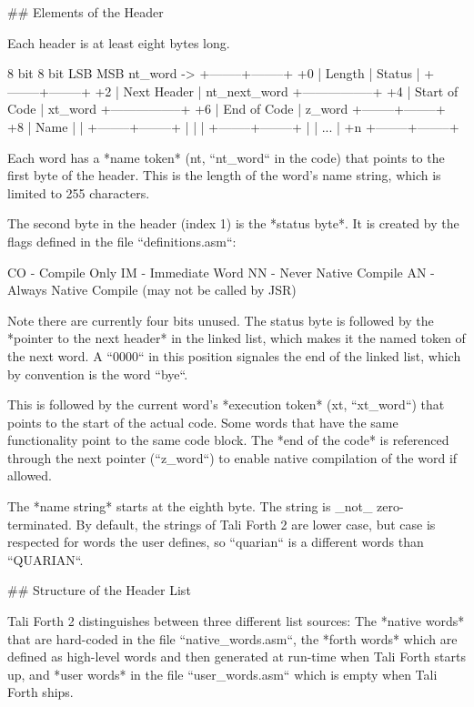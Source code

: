 ## Elements of the Header

Each header is at least eight bytes long.

              8 bit     8 bit
               LSB       MSB
 nt_word ->  +--------+--------+
          +0 | Length | Status |
             +--------+--------+
          +2 | Next Header     | nt_next_word
             +-----------------+
          +4 | Start of Code   | xt_word 
             +-----------------+
          +6 | End of Code     | z_word
             +--------+--------+
          +8 | Name   |        |
             +--------+--------+
             |        |        |
             +--------+--------+
             |        |  ...   |
          +n +--------+--------+


Each word has a *name token* (nt, ``nt_word`` in the code) that points to the
first byte of the header. This is the length of the word's name string, which is
limited to 255 characters. 

The second byte in the header (index 1) is the *status byte*. It is created by
the flags defined in the file ``definitions.asm``: 

        CO - Compile Only
        IM - Immediate Word
        NN - Never Native Compile 
        AN - Always Native Compile (may not be called by JSR)

Note there are currently four bits unused. The status byte is followed by the
*pointer to the next header* in the linked list, which makes it the named token of
the next word. A ``0000`` in this position signales the end of the linked list,
which by convention is the word ``bye``. 

This is followed by the current word's *execution token* (xt, ``xt_word``) that
points to the start of the actual code. Some words that have the same
functionality point to the same code block. The *end of the code* is referenced
through the next pointer (``z_word``) to enable native compilation of the word
if allowed. 

The *name string* starts at the eighth byte. The string is _not_
zero-terminated. By default, the strings of Tali Forth 2 are lower case, but
case is respected for words the user defines, so ``quarian`` is a different
words than ``QUARIAN``. 


## Structure of the Header List 

Tali Forth 2 distinguishes between three different list sources: The *native
words* that are hard-coded in the file ``native_words.asm``, the *forth words*
which are defined as high-level words and then generated at run-time when Tali
Forth starts up, and *user words* in the file ``user_words.asm`` which is empty
when Tali Forth ships. 

